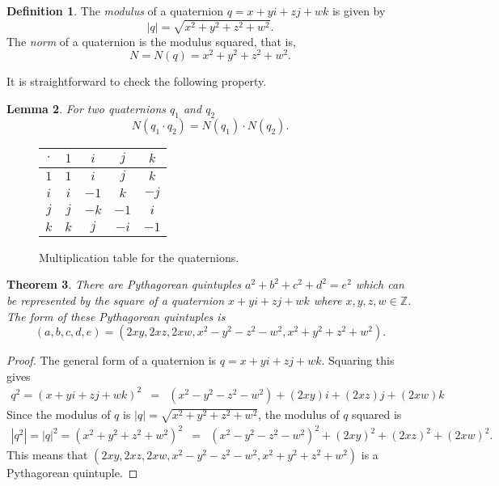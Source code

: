 \documentclass[12pt,table]{article}
\newtheorem{theorem}{Theorem}[section]
\newtheorem{lemma}[theorem]{Lemma}
\theoremstyle{definition}
\newtheorem{definition}[theorem]{Definition}
\theoremstyle{remark}
\newcommand{\Zzz}{\mathbb Z}
\numberwithin{equation}{section}
\begin{document}
\begin{definition}
The {\em modulus} 
of a quaternion
$q =  x+yi+zj+wk$
is given by 
\[
   |q| = \sqrt{x^2 + y^2 + z^2 + w^2}.
\]
The {\em norm} of a quaternion is the modulus squared, that is,
\[
     N =  N(q) = x^2 + y^2 + z^2 + w^2.
\]
\end{definition}


It is straightforward to check the following property.
\begin{lemma}
\label{lemma_norm_multiplicative}
For two quaternions $q_1$ and $q_2$
\[
     N(q_1 \cdot q_2) = N(q_1) \cdot N(q_2).
\]
\end{lemma}



\begin{figure}
\begin{center}
\begin{tabular}{c||c|c|c|c}
$\cdot$ & $1$ & $i$ & $j$ & $k$ \\
\hline
\hline
$1$ & $1$ & $i$ & $j$ & $k$ \\
\hline
$i$ & $i$ & $-1$ & $k$ & $-j$\\
\hline
$j$ & $j$ & $-k$ & $-1$ & $i$ \\
\hline
$k$ & $k$ & $j$ & $-i$ & $-1$
\end{tabular}
\end{center}
\caption{Multiplication table for the quaternions.}
\label{figure_multiplication_table}
\end{figure}



\begin{theorem}
\label{theorem_as_squares}
There are Pythagorean quintuples 
$a^2 + b^2 +c^2 +d^2 = e^2$ which can be represented
by the square of a quaternion $x+yi+zj+wk$ where $x, y, z, w \in \Zzz$.
The form of these Pythagorean quintuples is
\[
     (a,b,c,d,e) = (2xy, 2xz, 2xw, x^2 - y^2 - z^2 - w^2, x^2 + y^2 + z^2 +w^2).
\]
\end{theorem}
\begin{proof}
The general
 form of a quaternion is $q = x+yi+zj+wk$.
Squaring this gives
\begin{eqnarray*}
     q^2 = (x + yi + zj +wk)^2
      &=& (x^2- y^2 -z^2 - w^2)+
          (2xy)i + (2xz)j + (2xw)k
\end{eqnarray*}
Since the modulus of $q$ is $|q| = \sqrt{x^2+y^2+z^2+w^2}$, the
modulus of $q$ squared is 
\begin{eqnarray*}
     |q^2| = |q|^2 = (x^2 + y^2 + z^2 +w^2)^2
      &=& (x^2- y^2 -z^2 - w^2)^2 +
          (2xy)^2 + (2xz)^2 + (2xw)^2.
\end{eqnarray*}
This means that 
$(2xy, 2xz, 2xw, x^2 - y^2 - z^2 - w^2, x^2 + y^2 + z^2 +w^2)$
is a Pythagorean quintuple.
\end{proof}
\end{document}
